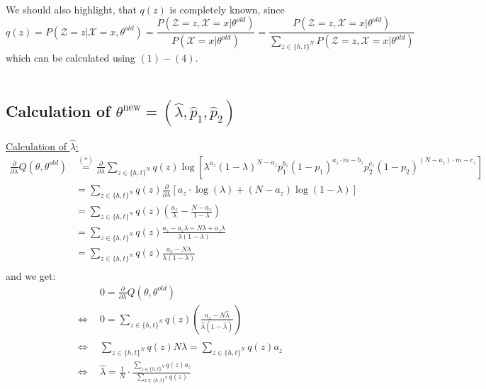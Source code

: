 \documentclass{article}
\begin{document}
\ \\
We should also highlight, that $q(z)$ is completely known, since\\
$$
q(z) 
= P(\mathcal{Z} = z | \mathcal{X} = x,\theta^{old})
= \frac{P(\mathcal{Z} = z , \mathcal{X} = x|\theta^{old})}{P(\mathcal{X} = x|\theta^{old})}
= \frac{P(\mathcal{Z} = z , \mathcal{X} = x|\theta^{old})}{\sum \limits _{z \in \{h, t\}^N}P(\mathcal{Z} = z , \mathcal{X} = x|\theta^{old})}
$$
which can be calculated using $(1) - (4)$.\\ \\
\subsection*{Calculation of $\theta^{\text{new}} = (\hat{\lambda},\hat{p}_1,\hat{p}_2)$}
\underline{Calculation of $\hat{\lambda}$:}
\begin{align*}
\frac{\partial}{\partial \lambda}Q(\theta,\theta^{old})& \stackrel{(*)}{=}  \frac{\partial}{\partial \lambda} \sum \limits _{z \in \{h, t\}^N} q(z)\log [ 
\lambda^{a_z} (1  - \lambda)^{N - a_z} p_1^{b_z}(1 - p_1)^{a_z \cdot m - b_z} p_2^{c_z}(1 - p_2)^{(N - a_z) \cdot m - c_z} ]&\\
&=  \sum \limits _{z \in \{h, t\}^N} q(z) \frac{\partial}{\partial \lambda} \left [ a_z \cdot \log( 
\lambda) + (N - a_z)\log(1  - \lambda) \right ] \\
&=  \sum \limits _{z \in \{h, t\}^N} q(z)\left( \frac{a_z}{\lambda} - \frac{N - a_z}{1  - \lambda}  \right )\\
&=  \sum \limits _{z \in \{h, t\}^N} q(z) \frac{a_z   - a_z\lambda - N \lambda  + a_z \lambda }{\lambda (1  - \lambda)}  \\
&=  \sum \limits _{z \in \{h, t\}^N} q(z) \frac{a_z   - N \lambda }{\lambda (1  - \lambda)}\\
\end{align*}
and we get:
\begin{align*}
                 &0 =  \frac{\partial}{\partial \lambda}Q(\theta,\theta^{old}) &\\
\Leftrightarrow ~~&0 = \sum \limits _{z \in \{h, t\}^N} q(z)\left( \frac{a_z   - N \hat{\lambda} }{\hat{\lambda} (1  - \hat{\lambda})}  \right )\\  
\Leftrightarrow ~~&\sum \limits _{z \in \{h, t\}^N} q(z) N \hat{\lambda} = \sum \limits _{z \in \{h, t\}^N} q(z)a_z \\
\Leftrightarrow ~~&\hat{\lambda} = \frac{1}{N} \cdot \frac{\sum \limits _{z \in \{h, t\}^N} q(z)a_z}{\sum \limits _{z \in \{h, t\}^N} q(z)} \\   
\end{align*}
\end{document}
